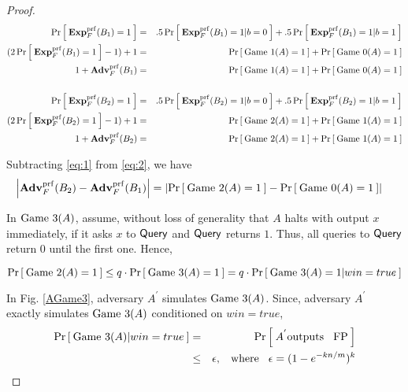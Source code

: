 \begin{proof}
\begin{eqnarray}
\nonumber \Pr\left[\: \mathbf{Exp}^{\mathrm{prf}}_{F}(B_1) = 1 \:\right] &=& .5\Pr\left[\: \mathbf{Exp}^{\mathrm{prf}}_{F}(B_1)=1|b=0 \:\right] + .5\Pr\left[\: \mathbf{Exp}^{\mathrm{prf}}_{F}(B_1) = 1|b=1 \:\right]\\
\nonumber (2\Pr\left[\: \mathbf{Exp}^{\mathrm{prf}}_{F}(B_1) = 1 \:\right] - 1) + 1 &=& \Pr\left[\: \text{Game 1}(A)=1 \:\right] + \Pr\left[\: \text{Game 0}(A)=1 \:\right]\\
 1 + \mathbf{Adv}^{\mathrm{prf}}_{F}(B_1) &=& \Pr\left[\: \text{Game 1}(A)=1 \:\right] + \Pr\left[\: \text{Game 0}(A)=1 \:\right] \label{eq:1}\\
\nonumber& &\\
\nonumber \Pr\left[\: \mathbf{Exp}^{\mathrm{prf}}_{F}(B_2) = 1 \:\right] &=& .5\Pr\left[\: \mathbf{Exp}^{\mathrm{prf}}_{F}(B_2)=1|b=0 \:\right] + .5\Pr\left[\: \mathbf{Exp}^{\mathrm{prf}}_{F}(B_2) = 1|b=1 \:\right]\\
\nonumber (2\Pr\left[\: \mathbf{Exp}^{\mathrm{prf}}_{F}(B_2) = 1 \:\right] - 1) + 1 &=& \Pr\left[\: \text{Game 2}(A)=1 \:\right] + \Pr\left[\: \text{Game 1}(A)=1 \:\right]\\
 1 + \mathbf{Adv}^{\mathrm{prf}}_{F}(B_2) &=& \Pr\left[\: \text{Game 2}(A)=1 \:\right] + \Pr\left[\: \text{Game 1}(A)=1 \:\right]\label{eq:2}
\end{eqnarray}

Subtracting \ref{eq:1} from \ref{eq:2}, we have
\begin{eqnarray}
{\displaystyle \left| { \mathbf{Adv}^{\mathrm{prf}}_{F}(B_2) - \mathbf{Adv}^{\mathrm{prf}}_{F}(B_1)} \right| } &= {\displaystyle \left| {\Pr\left[\: \text{Game 2}(A)=1 \:\right] - \Pr\left[\: \text{Game 0}(A)=1 \:\right]} \right| }\label{eq:2a}
\end{eqnarray}

In $\text{Game 3}(A)$, assume, without loss of generality that $A$ halts with output $x$ immediately, if it asks $x$ to $\mathsf{Query}$ and $\mathsf{Query}$ returns $1$. Thus, all queries to $\mathsf{Query}$ return 0 until the first one. Hence,

\begin{equation}
\Pr\left[\: \text{Game 2}(A)=1 \:\right] \leq q \cdot \Pr\left[\: \text{Game 3}(A)=1 \:\right] = q \cdot \Pr\left[\: \text{Game 3}(A)=1|win=true \:\right]\label{eq:3}
\end{equation}

In Fig. \ref{AGame3}, adversary $A^{'}$ simulates $\text{Game 3}(A)$. Since, adversary $A^{'}$ exactly simulates $\text{Game 3}(A)$ conditioned on $win = true$, 
\begin{eqnarray}
\nonumber \Pr\left[\: \text{Game 3}(A)|win=true \:\right] &=& \Pr\left[\: A^{'} \mathrm{outputs \hspace*{2ex} FP} \:\right]\\
& \leq & \epsilon, \hspace*{2ex} \mathrm{where} \hspace*{2ex} \epsilon = (1-e^{-kn/m})^k\label{eq:4}
\end{eqnarray}


\end{proof}
